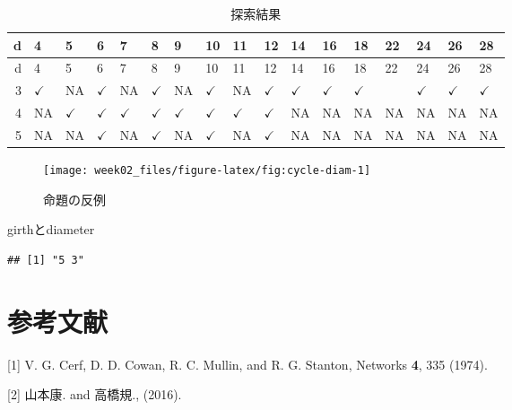\documentclass[xelatex,ja=standard,11pt]{bxjsarticle}
\newenvironment{Shaded}{\begin{snugshade}}{\end{snugshade}}
\newcommand{\KeywordTok}[1]{\textcolor[rgb]{0.13,0.29,0.53}{\textbf{#1}}}
\newcommand{\StringTok}[1]{\textcolor[rgb]{0.31,0.60,0.02}{#1}}
\newcommand{\OperatorTok}[1]{\textcolor[rgb]{0.81,0.36,0.00}{\textbf{#1}}}
\newcommand{\NormalTok}[1]{#1}
\begin{document}
\begin{longtable}[]{@{}rllllllllllllllll@{}}
\caption{探索結果}\tabularnewline
\toprule
d & 4 & 5 & 6 & 7 & 8 & 9 & 10 & 11 & 12 & 14 & 16 & 18 & 22 & 24 & 26 &
28\tabularnewline
\midrule
\endfirsthead
\toprule
d & 4 & 5 & 6 & 7 & 8 & 9 & 10 & 11 & 12 & 14 & 16 & 18 & 22 & 24 & 26 &
28\tabularnewline
\midrule
\endhead
3 & \(\checkmark\) & NA & \(\checkmark\) & NA & \(\checkmark\) & NA &
\(\checkmark\) & NA & \(\checkmark\) & \(\checkmark\) & \(\checkmark\) &
\(\checkmark\) & & \(\checkmark\) & \(\checkmark\) &
\(\checkmark\)\tabularnewline
4 & NA & \(\checkmark\) & \(\checkmark\) & \(\checkmark\) &
\(\checkmark\) & \(\checkmark\) & \(\checkmark\) & \(\checkmark\) &
\(\checkmark\) & NA & NA & NA & NA & NA & NA & NA\tabularnewline
5 & NA & NA & \(\checkmark\) & NA & \(\checkmark\) & NA & \(\checkmark\)
& NA & \(\checkmark\) & NA & NA & NA & NA & NA & NA & NA\tabularnewline
\bottomrule
\end{longtable}

\begin{figure}

{\centering \texttt{[image: week02\_files/figure-latex/fig:cycle-diam-1]} 

}

\caption{命題の反例}\label{fig:fig:cycle-diam}
\end{figure}

girthとdiameter

\begin{Shaded}
\end{Shaded}

\begin{verbatim}
## [1] "5 3"
\end{verbatim}

\section*{参考文献}

\hypertarget{refs}{}
\hypertarget{ref-Cerf1974}{}
{[}1{]} V. G. Cerf, D. D. Cowan, R. C. Mullin, and R. G. Stanton,
Networks \textbf{4}, 335 (1974).

\hypertarget{ref-Yamamoto2016}{}
{[}2{]} 山本康. and 高橋規., (2016).
\end{document}
